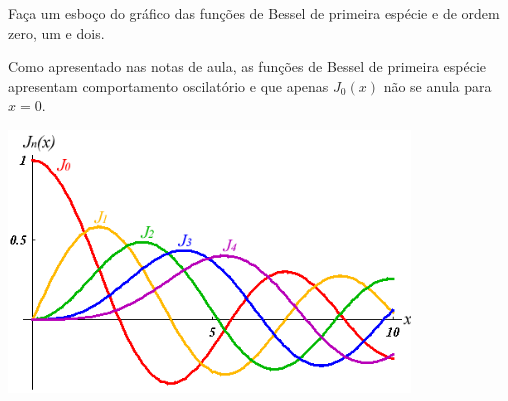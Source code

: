 \documentclass[a4paper,12pt, leqno, answers]{exam}
\begin{document}
\begin{questions}
\begin{parts}
\begin{solution}
        \end{solution}
    \end{parts}

    \question[P2 de 2006] Fa\c{c}a um esbo\c{c}o do gr\'{a}fico das fun\c{c}\~{o}es de Bessel de primeira esp\'{e}cie e de ordem zero, um e dois.
    \begin{solution}
        Como apresentado nas notas de aula, as fun\c{c}\~{o}es de Bessel de primeira esp\'{e}cie apresentam comportamento oscilat\'{o}rio e que apenas $J_0(x)$ n\~{a}o se anula para $x = 0$.
        \begin{center}
            \includegraphics[width=0.8\textwidth]{BesselJPlot.png}
        \end{center}
    \end{solution}


\end{questions}
\end{document}
